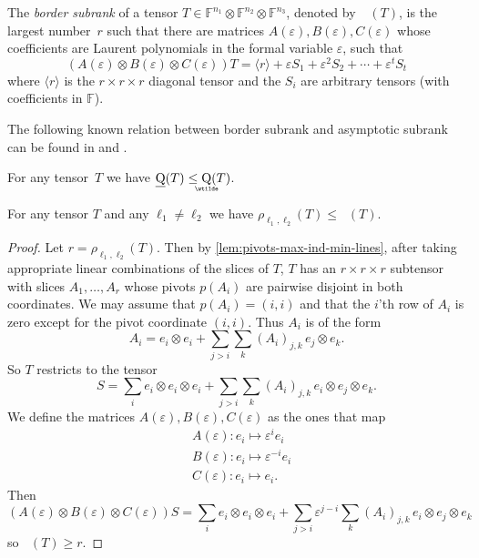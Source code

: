 \documentclass{daj}
\DeclareMathOperator{\asympsubrank}{\underaccent{\wtilde}{Q}}
\DeclareMathOperator{\bordersubrank}{\underline{Q}}
\newcommand{\FF}{\mathbb{F}}
\newcommand{\eps}{\varepsilon}
\begin{document}
%

%

%
%
%
%
%
%
%
%
%
%
%
%
%
%
%
%
%
%
%
%
%
%
%
%
%
%
%

%

%

%

\begin{definition}
The \emph{border subrank} of a tensor $T \in \FF^{n_1} \otimes  \FF^{n_2} \otimes \FF^{n_3}$, denoted by~$\bordersubrank(T)$, is the largest number~$r$ such that there are matrices $A(\eps), B(\eps), C(\eps)$ whose coefficients are Laurent polynomials in the formal variable $\eps$, such that
\[
(A(\eps) \otimes B(\eps) \otimes C(\eps))  T = \langle r\rangle + \eps S_1 + \eps^2 S_2 + \cdots + \eps^t S_t
\]
where $\langle r\rangle$ is the $r \times r \times r$ diagonal tensor and the $S_i$ are arbitrary tensors (with coefficients in $\FF$). 
\end{definition}

The following known relation between border subrank and asymptotic subrank can be found in \cite[Proposition 5.10]{strassen1988asymptotic} and \cite[Proposition 15.26]{burgisser1997algebraic}.
\begin{lemma}\label{lem:border-asymp-subrank}
    For any tensor~$T$ we have $\bordersubrank(T) \leq \asympsubrank(T)$.
\end{lemma}

\begin{theorem}\label{th:rho-bordersubrank}
    For any tensor $T$ and any ${\ell_1}\neq {\ell_2}$ we have
    $\rho_{{\ell_1},{\ell_2}}(T) \leq \bordersubrank(T)$.
\end{theorem}
\begin{proof}
    Let $r = \rho_{{\ell_1},{\ell_2}}(T)$.
    Then by \autoref{lem:pivots-max-ind-min-lines}, after taking appropriate linear combinations of the slices of $T$, $T$ has an $r \times r \times r$ subtensor with slices $A_1, \ldots, A_r$ whose pivots $p(A_i)$ are pairwise disjoint in both coordinates. We may assume that $p(A_i) = (i,i)$ and that the $i$'th row of $A_i$ is zero except for the pivot coordinate $(i,i)$. Thus $A_i$ is of the form
    \[
    A_i = e_i \otimes e_i 
    + \sum_{j > i} \sum_{k} (A_i)_{j,k}\, e_j \otimes e_k.
    \]
    So $T$ restricts to the tensor
    \[
    S = \sum_i e_i \otimes e_i \otimes e_i 
    + \sum_{j > i} \sum_{k} (A_i)_{j,k}\, e_i \otimes e_j \otimes e_k.
    \]
    We define the matrices $A(\eps), B(\eps), C(\eps)$ as the ones that map
    \begin{align*}
    &A(\eps) : e_i \mapsto \eps^i e_i\\
    &B(\eps) : e_i \mapsto \eps^{-i} e_i\\
    &C(\eps) : e_i \mapsto e_i.
    \end{align*}
    Then 
    \[
(A(\eps) \otimes B(\eps) \otimes C(\eps))S = \sum_i e_i \otimes e_i \otimes e_i + \sum_{j > i} \eps^{j-i} \sum_{k} (A_i)_{j,k}\, e_i \otimes e_j \otimes e_k
    \]
    so $\bordersubrank(T) \geq r$.
\end{proof}
\end{document}
